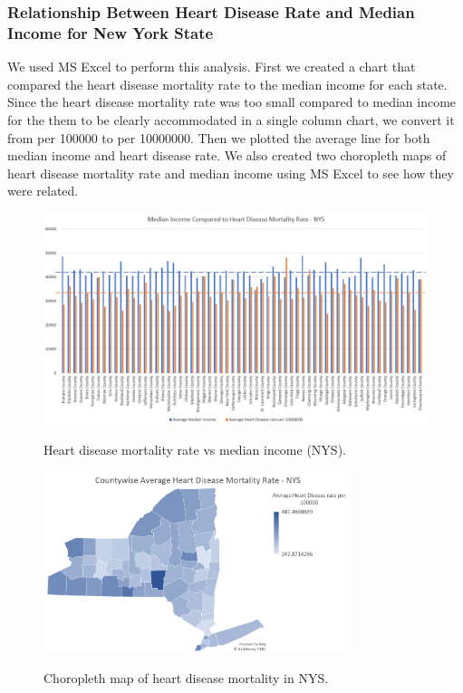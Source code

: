 \documentclass[journal,12pt,onecolumn]{IEEEtran}
\begin{document}
\subsubsection{Relationship Between Heart Disease Rate and Median Income for New York State}
We used MS Excel to perform this analysis.
First we created a chart that compared the heart disease mortality rate to the median income for each state.
Since the heart disease mortality rate was too small compared to median income for the them to be clearly accommodated in a single column chart, we convert it from per 100000 to per 10000000.
Then we plotted the average line for both median income and heart disease rate.
We also created two choropleth maps of heart disease mortality rate and median income using MS Excel to see how they were related.

\begin{figure}[H]
\caption{Heart disease mortality rate vs median income (NYS).}
\centering
\includegraphics[width=\textwidth]{figures/column.PNG}
\label{fig:col1}
\end{figure}

\begin{figure}[H]
\caption{Choropleth map of heart disease mortality in NYS.}
\centering
\includegraphics[width=0.8\textwidth]{figures/map_heart.PNG}
\label{fig:hdmap}
\end{figure}
\end{document}

